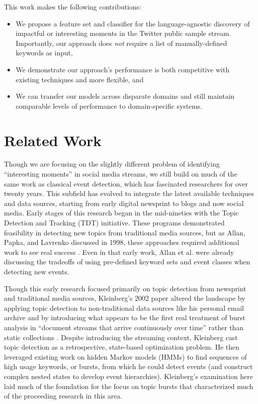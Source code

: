\documentclass[letterpaper]{article}
\begin{document}
This work makes the following contributions:
%
\begin{itemize}
\item We propose a feature set and classifier for the language-agnostic discovery of impactful or interesting moments in the Twitter public sample stream. Importantly, our approach does {\it not} require a list of manually-defined keywords as input,

\item We demonstrate our approach's performance is both competitive with existing techniques and more flexible, and

\item We can transfer our models across disparate domains and still maintain comparable levels of performance to domain-specific systems.
\end{itemize}

\section{Related Work}
\label{sect:relatedWork}

Though we are focusing on the slightly different problem of identifying ``interesting moments'' in social media streams, we still build on much of the same work as classical event detection, which has fascinated researchers for over twenty years.
This subfield has evolved to integrate the latest available techniques and data sources, starting from early digital newsprint to blogs and now social media.
Early stages of this research began in the mid-nineties with the Topic Detection and Tracking (TDT) initiative.
These programs demonstrated feasibility in detecting new topics from traditional media sources, but as Allan, Papka, and Lavrenko discussed in 1998, these approaches required additional work to see real success \cite{allan1998line}.
Even in that early work, Allan et al. were already discussing the tradeoffs of using pre-defined keyword sets and event classes when detecting new events.

Though this early research focused primarily on topic detection from newsprint and traditional media sources, Kleinberg's 2002 paper altered the landscape by applying topic detection to non-traditional data sources like his personal email archive and by introducing what appears to be the first real treatment of burst analysis in ``document streams that arrive continuously over time'' rather than  static collections \cite{Kleinberg:2002:BHS:775047.775061}. 
Despite introducing the streaming context, Kleinberg cast topic detection as a retrospective, state-based optimization problem.
He then leveraged existing work on hidden Markov models (HMMs) to find sequences of high usage keywords, or bursts, from which he could detect events (and construct complex nested states to develop event hierarchies).
Kleinberg's examination here laid much of the foundation for the focus on topic bursts that characterized much of the proceeding research in this area.
\end{document}
